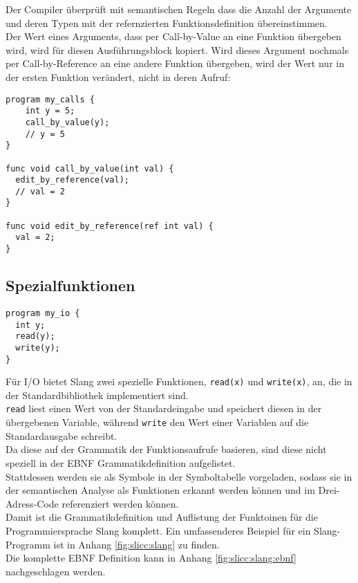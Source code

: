 Der Compiler überprüft mit semantischen Regeln dass die Anzahl der Argumente und deren Typen mit der refernzierten Funktionsdefinition übereinstimmen.\\
Der Wert eines Arguments, dass per Call-by-Value an eine Funktion übergeben wird, wird für diesen Ausführungsblock kopiert.
Wird dieses Argument nochmals per Call-by-Reference an eine andere Funktion übergeben, wird der Wert nur in der ersten Funktion verändert, nicht in deren Aufruf:

\begin{lstlisting}[caption={Call-by-Value und Call-by-Reference}]
program my_calls {
    int y = 5;
    call_by_value(y);
    // y = 5
}

func void call_by_value(int val) {
  edit_by_reference(val);
  // val = 2
}

func void edit_by_reference(ref int val) {
  val = 2;
}
\end{lstlisting}

\subsection{Spezialfunktionen}

\begin{lstlisting}[caption={Slang Beispiel I/O Funktionen}]
program my_io {
  int y;
  read(y);
  write(y);
}
\end{lstlisting}

Für I/O bietet Slang zwei spezielle Funktionen, \texttt{read(x)} und \texttt{write(x)}, an, die in der Standardbibliothek implementiert sind.\\
\texttt{read} liest einen Wert von der Standardeingabe und speichert diesen in der übergebenen Variable, während \texttt{write} den Wert einer Variablen auf die Standardausgabe schreibt.\\

Da diese auf der Grammatik der Funktionsaufrufe basieren, sind diese nicht speziell in der EBNF Grammatikdefinition aufgelistet.\\
Stattdessen werden sie als Symbole in der Symboltabelle vorgeladen, sodass sie in der semantischen Analyse als Funktionen erkannt werden können und im Drei-Adress-Code referenziert werden können.\\

Damit ist die Grammatikdefinition und Auflistung der Funktoinen für die Programmiersprache Slang komplett.
Ein umfassenderes Beispiel für ein Slang-Programm ist in Anhang \ref{fig:slicc:slang} zu finden. \\
Die komplette EBNF Definition kann in Anhang \ref{fig:slicc:slang:ebnf} nachgeschlagen werden. 

